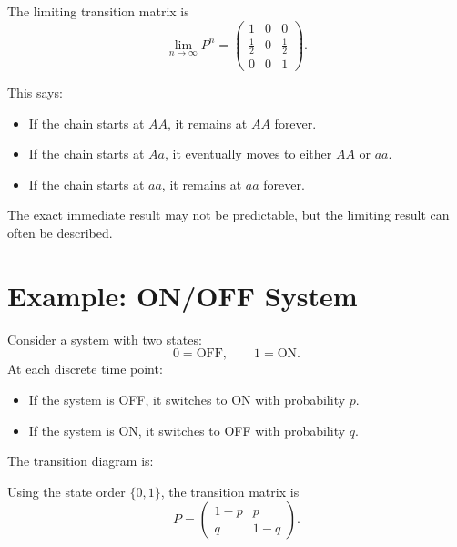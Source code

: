 \documentclass[12pt,a4paper]{article}
\theoremstyle{lecturestyle}
\begin{document}
The limiting transition matrix is
\[
\lim_{n\to\infty}P^n
=
\begin{pmatrix}
1 & 0 & 0\\
\frac12 & 0 & \frac12\\
0 & 0 & 1
\end{pmatrix}.
\]

This says:
\begin{itemize}[leftmargin=1.2cm]
    \item If the chain starts at $AA$, it remains at $AA$ forever.
    \item If the chain starts at $Aa$, it eventually moves to either $AA$ or $aa$.
    \item If the chain starts at $aa$, it remains at $aa$ forever.
\end{itemize}

The exact immediate result may not be predictable, but the limiting result can often be described.

\section{Example: ON/OFF System}

Consider a system with two states:
\[
0=\text{OFF}, \qquad 1=\text{ON}.
\]
At each discrete time point:
\begin{itemize}[leftmargin=1.2cm]
    \item If the system is OFF, it switches to ON with probability $p$.
    \item If the system is ON, it switches to OFF with probability $q$.
\end{itemize}

The transition diagram is:

\begin{center}
\end{center}

Using the state order $\{0,1\}$, the transition matrix is
\[
P=
\begin{pmatrix}
1-p & p\\
q & 1-q
\end{pmatrix}.
\]
\end{document}
